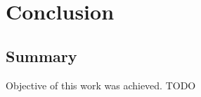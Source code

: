 \chapter{Conclusion}\label{chapter:summary}

\section{Summary}

Objective of this work was achieved. TODO